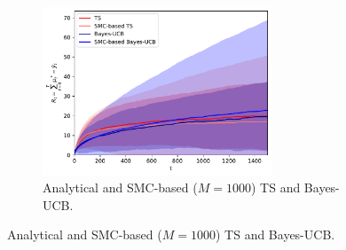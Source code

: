 \begin{figure}[!h]
	\centering
	\begin{subfigure}[b]{\textwidth}
		\centering
		\includegraphics[width=0.75\textwidth]{./fods_figs/static/bernoulli/A5/theta0.1_0.3_0.5_0.6_0.8_M1000_cumulative_regret}
		\caption{Analytical and SMC-based ($M=1000$) TS and Bayes-UCB.}
	\end{subfigure}
	

\end{figure}
